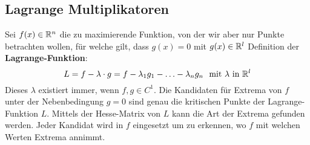 \subsection{Lagrange Multiplikatoren}
Sei $f(x) \in \mathbb{R}^{n}$ die zu maximierende Funktion, von der wir aber nur Punkte
betrachten wollen, für welche gilt, dass $g(x) = 0$ mit $g(x) \in \mathbb{R}^{l}$
Definition der \textbf{Lagrange-Funktion}:
\[ L = f-\lambda \cdot g = f - \lambda_{1} g_{1} - \ldots - \lambda_{n}g_{n} ~ \text{ mit $\lambda$ in } \mathbb{R}^{l} \]
Dieses $\lambda$ existiert immer, wenn $f, g \in C^{1}$.
Die Kandidaten für Extrema von $f$ unter der Nebenbedingung $g = 0$ sind genau die
kritischen Punkte der Lagrange-Funktion $L$. Mittels der Hesse-Matrix von $L$
kann die Art der Extrema gefunden werden. Jeder Kandidat wird in $f$ eingesetzt
um zu erkennen, wo $f$ mit welchen Werten Extrema annimmt.

